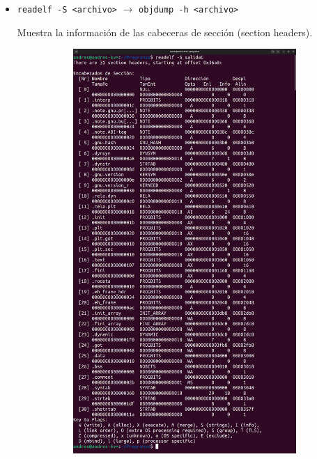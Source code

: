 \documentclass{article}
\begin{document}
\begin{itemize}
    \item \verb|readelf -S <archivo>| $\rightarrow$ \verb|objdump -h <archivo>|
    
    Muestra la información de las cabeceras de sección (section headers).

    \begin{figure}[H]
        \centering
        \begin{subfigure}{0.45\textwidth}
            \centering
            \includegraphics[width=\textwidth]{imagenes/C/merged.png}

\end{subfigure}
\end{figure}
\end{itemize}
\end{document}

